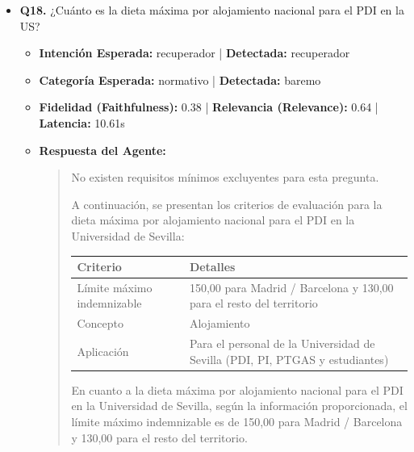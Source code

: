 \documentclass[12pt,a4paper,oneside]{report}
\begin{document}
\begin{itemize}
  
\item \textbf{Q18.} ¿Cuánto es la dieta máxima por alojamiento nacional para el PDI en la US? \\
        \begin{itemize}
          \item \textbf{Intención Esperada:} recuperador | \textbf{Detectada:} recuperador
          \item \textbf{Categoría Esperada:} normativo | \textbf{Detectada:} baremo
          \item \textbf{Fidelidad (Faithfulness):} 0.38 | \textbf{Relevancia (Relevance):} 0.64 | \textbf{Latencia:} 10.61s
          \item \textbf{{Respuesta del Agente:}} \\
                \begin{quote}
No existen requisitos mínimos excluyentes para esta pregunta.

A continuación, se presentan los criterios de evaluación para la dieta máxima por alojamiento nacional para el PDI en la Universidad de Sevilla:


\begin{tabular}{p{3.5cm} p{8cm}}
\toprule
\textbf{Criterio} & \textbf{Detalles} \\
\midrule
Límite máximo indemnizable & 150,00   para Madrid / Barcelona y 130,00   para el resto del territorio \\
Concepto & Alojamiento \\
Aplicación & Para el personal de la Universidad de Sevilla (PDI, PI, PTGAS y estudiantes) \\
\bottomrule
\end{tabular}


En cuanto a la dieta máxima por alojamiento nacional para el PDI en la Universidad de Sevilla, según la información proporcionada, el límite máximo indemnizable es de 150,00   para Madrid / Barcelona y 130,00   para el resto del territorio.


\end{quote}
\end{itemize}
\end{itemize}
\end{document}
